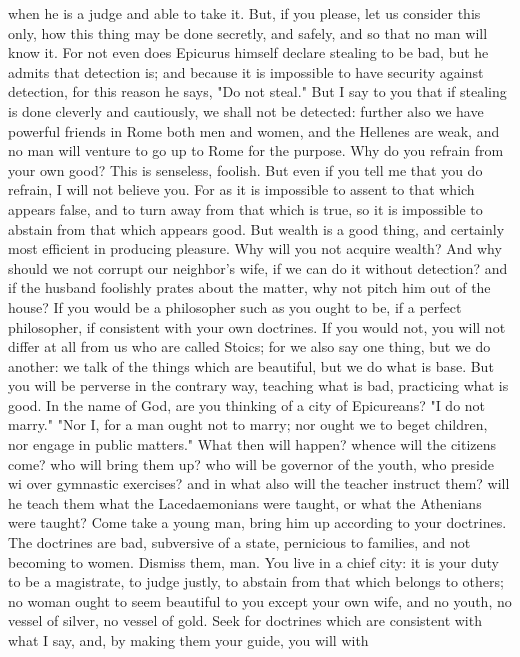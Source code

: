 \documentclass[a4paper]{article}
\begin{document}
when he is a judge and able to take it. But, if you please, let us consider
this only, how this thing may be done secretly, and safely, and so that no man
will know it. For not even does Epicurus himself declare stealing to be bad,
but he admits that detection is; and because it is impossible to have security
against detection, for this reason he says, "Do not steal." But I say to you
that if stealing is done cleverly and cautiously, we shall not be detected:
further also we have powerful friends in Rome both men and women, and the
Hellenes are weak, and no man will venture to go up to Rome for the purpose.
Why do you refrain from your own good? This is senseless, foolish. But even if
you tell me that you do refrain, I will not believe you. For as it is
impossible to assent to that which appears false, and to turn away from that
which is true, so it is impossible to abstain from that which appears good. But
wealth is a good thing, and certainly most efficient in producing pleasure. Why
will you not acquire wealth? And why should we not corrupt our neighbor's wife,
if we can do it without detection? and if the husband foolishly prates about
the matter, why not pitch him out of the house? If you would be a philosopher
such as you ought to be, if a perfect philosopher, if consistent with your own
doctrines. If you would not, you will not differ at all from us who are called
Stoics; for we also say one thing, but we do another: we talk of the things
which are beautiful, but we do what is base. But you will be perverse in the
contrary way, teaching what is bad, practicing what is good.
    In the name of God, are you thinking of a city of Epicureans? "I do not
marry." "Nor I, for a man ought not to marry; nor ought we to beget children,
nor engage in public matters." What then will happen? whence will the citizens
come? who will bring them up? who will be governor of the youth, who preside wi
over gymnastic exercises? and in what also will the teacher instruct them? will
he teach them what the Lacedaemonians were taught, or what the Athenians were
taught? Come take a young man, bring him up according to your doctrines. The
doctrines are bad, subversive of a state, pernicious to families, and not
becoming to women. Dismiss them, man. You live in a chief city: it is your duty
to be a magistrate, to judge justly, to abstain from that which belongs to
others; no woman ought to seem beautiful to you except your own wife, and no
youth, no vessel of silver, no vessel of gold. Seek for doctrines which are
consistent with what I say, and, by making them your guide, you will with
\end{document}
